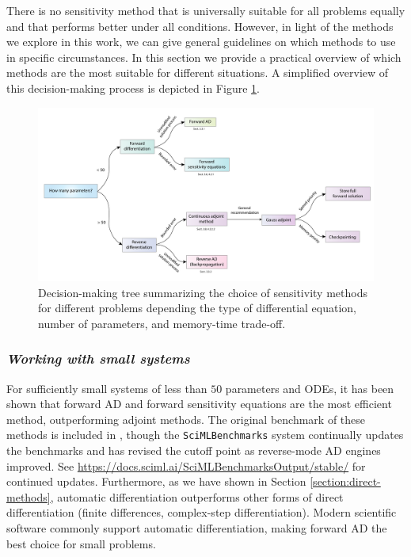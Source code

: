 
There is no sensitivity method that is universally suitable for all problems equally and that performs better under all conditions. 
However, in light of the methods we explore in this work, we can give general guidelines on which methods to use in specific circumstances. In this section we provide a practical overview of which methods are the most suitable for different situations. 
A simplified overview of this decision-making process is depicted in Figure \ref{fig:roadmap}. 

\begin{figure}[tb]
    \centering
    \includegraphics[width=1\textwidth]{tex/figures/roadmap.pdf}
    \caption{Decision-making tree summarizing the choice of sensitivity methods for different problems depending the type of differential equation, number of parameters, and memory-time trade-off.}
    \label{fig:roadmap}
\end{figure}

\subsubsection*{\textit{Working with small systems}}

For sufficiently small systems of less than $50$ parameters and ODEs, it has been shown that forward AD and forward sensitivity equations are the most efficient method, outperforming adjoint methods. 
The original benchmark of these methods is included in \cite{ma2021comparison}, though the \texttt{SciMLBenchmarks} system continually updates the benchmarks and has revised the cutoff point as reverse-mode AD engines improved. 
See \url{https://docs.sciml.ai/SciMLBenchmarksOutput/stable/} for continued updates.
Furthermore, as we have shown in Section \ref{section:direct-methods}, automatic differentiation outperforms other forms of direct differentiation (finite differences, complex-step differentiation). 
Modern scientific software commonly support automatic differentiation, making forward AD the best choice for small problems. 

